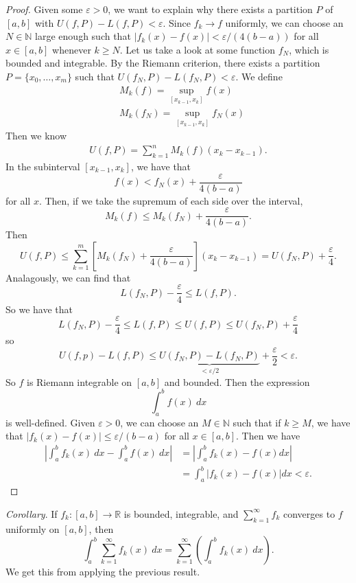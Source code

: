 \documentclass[11pt]{article}
\theoremstyle{definition}
\newcommand{\R}{\mathbb{R}}                      %
\newcommand{\N}{\mathbb{N}}
\begin{document}
\begin{proof}
    Given some $\varepsilon>0$, we want to explain why there exists a partition $P$ of $[a,b]$ with $U(f,P)-L(f,P)<\varepsilon$. Since $f_k\to f$ uniformly, we can choose an $N\in\N$ large enough such that $|f_k(x)-f(x)|<\varepsilon/(4(b-a))$ for all $x\in[a,b]$ whenever $k\geq N$. Let us take a look at some function $f_N$, which is bounded and integrable. By the Riemann criterion, there exists a partition $P=\{x_0,\dots,x_m\}$ such that $U(f_N,P)-L(f_N,P)<\varepsilon$. We define
    \begin{align*}
    &M_k(f)=\sup_{[x_{k-1},x_k]}f(x)\\
    &M_k(f_N)=\sup_{[x_{k-1},x_k]}f_N(x)
    \end{align*}
    Then we know 
    \begin{align*}
        U(f,P)=\sum_{k=1}^n M_k(f)(x_k-x_{k-1}).
    \end{align*}
    In the subinterval $[x_{k-1},x_k]$, we have that
    $$
    f(x)<f_N(x)+\frac{\varepsilon}{4(b-a)}
    $$
    for all $x$. Then, if we take the supremum of each side over the interval,
    $$
    M_k(f)\leq M_k(f_N)+\frac{\varepsilon}{4(b-a)}.
    $$
    Then
    $$
    U(f,P)\leq \sum_{k=1}^m \left[M_k(f_N)+\frac{\varepsilon}{4(b-a)}\right](x_k-x_{k-1})=U(f_N,P)+\frac{\varepsilon}{4}.
    $$
    Analagously, we can find that 
    $$
    L(f_N,P)-\frac{\varepsilon}{4}\leq L(f,P).
    $$
    So we have that
    $$
    L(f_N,P)-\frac{\varepsilon}{4}\leq L(f,P)\leq U(f,P)\leq U(f_N,P)+\frac{\varepsilon}{4}
    $$
    so 
    $$
    U(f,p)-L(f,P)\leq \underbrace{U(f_N,P)-L(f_N,P)}_{<\varepsilon/2}+\frac{\varepsilon}{2}<\varepsilon.
    $$
    So $f$ is Riemann integrable on $[a,b]$ and bounded. Then the expression
    $$
    \int_a^b f(x)~dx
    $$
    is well-defined. Given $\varepsilon>0$, we can choose an $M\in \N$ such that if $k\geq M$, we have that $|f_k(x)-f(x)|\leq \varepsilon/(b-a)$ for all $x\in[a,b]$. Then we have
    $$
    \begin{aligned}
        \left|\int_a^b f_k(x)~dx-\int_a^b f(x)~dx\right|&=\left|\int_a^b f_k(x)-f(x)dx\right|\\
        &=\int_a^b\left| f_k(x)-f(x)\right|dx <\varepsilon.
    \end{aligned}
    $$
\end{proof}

\textit{Corollary}. If $f_k:[a,b]\to\R$ is bounded, integrable, and $\sum_{k=1}^\infty f_k$ converges to $f$ uniformly on $[a,b]$, then 
$$
\int_a^b \sum_{k=1}^\infty f_k(x)~dx=\sum_{k=1}^\infty \left(\int_a^b f_k(x)~dx\right).
$$
We get this from applying the previous result.
\end{document}
